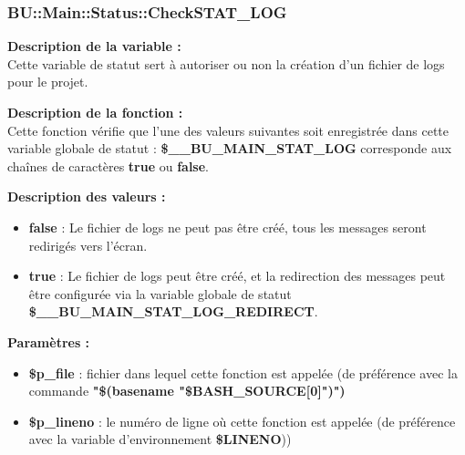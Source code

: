 \documentclass[a4paper,10pt]{article}
\begin{document}
\color{blue}
\subsubsection{\color{mauve}BU::Main::Status::CheckSTAT\_LOG}\color{white}

\begin{justify}
    \textbf{Description de la variable :}\\
    Cette variable de statut sert à autoriser ou non la création d'un fichier de logs pour le projet.
\end{justify}

\begin{justify}
    \textbf{Description de la fonction :}\\
    Cette fonction vérifie que l'une des valeurs suivantes soit enregistrée dans cette variable globale de statut : \textbf{\color{orange}\$\_\_BU\_MAIN\_STAT\_LOG} corresponde aux chaînes de caractères \textbf{true} ou \textbf{false}.
\end{justify}

\begin{justify}
    \textbf{Description des valeurs :}

    \begin{itemize}
        \item \textbf{false} : Le fichier de logs ne peut pas être créé, tous les messages seront redirigés vers l'écran.\\

        \item \textbf{true} : Le fichier de logs peut être créé, et la redirection des messages peut être configurée via la variable globale de statut \textbf{\color{orange}\$\_\_BU\_MAIN\_STAT\_LOG\_REDIRECT}.
    \end{itemize}
\end{justify}


\begin{justify}
    \textbf{Paramètres :}
    \begin{itemize}
        \item \color{orange}\textbf{\$p\_file}\color{white} : fichier dans lequel cette fonction est appelée (de préférence avec la commande \textbf{"\$(\color{gray}basename \color{white}"\color{orange}\$BASH\_SOURCE[0]\color{white}")")}\\

        \item \color{orange}\textbf{\$p\_lineno}\color{white} : le numéro de ligne où cette fonction est appelée (de préférence avec la variable d'environnement \textbf{\color{orange}\$LINENO}))
    \end{itemize}
\end{justify}
\end{document}
